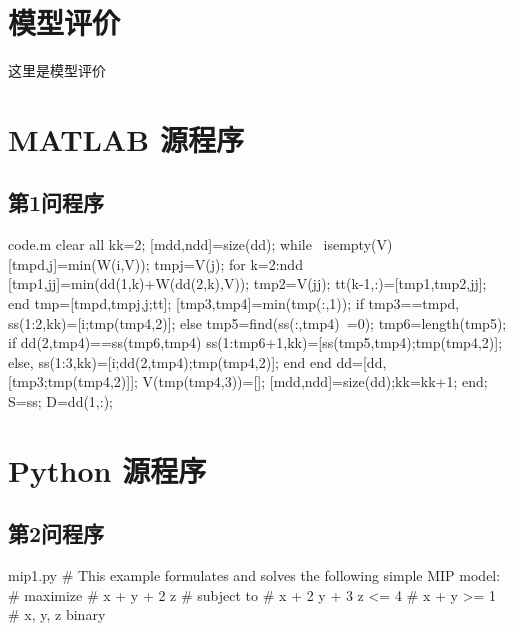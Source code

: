 \documentclass[bwprint,fontset=fandol]{gmcmthesis}
\begin{document}
\section{模型评价}

这里是模型评价



\cite{mittelbach_latex_2004,wright_latex3_2009,beeton_unicode_2008,vieth_experiences_2009}





\clearpage
\begin{appendices}
\section{MATLAB 源程序}
\renewcommand{\thesubsection}{A\thinskip.\thinskip\arabic{subsection}}
\subsection{第1问程序}
\vspace{-2ex}

\begin{Matlab}{code.m}
clear all
kk=2;
[mdd,ndd]=size(dd);
while ~isempty(V)
    [tmpd,j]=min(W(i,V));
    tmpj=V(j);
    for k=2:ndd
        [tmp1,jj]=min(dd(1,k)+W(dd(2,k),V));
        tmp2=V(jj);
        tt(k-1,:)=[tmp1,tmp2,jj];
    end
    tmp=[tmpd,tmpj,j;tt];
    [tmp3,tmp4]=min(tmp(:,1));
    if tmp3==tmpd,
        ss(1:2,kk)=[i;tmp(tmp4,2)];
    else
        tmp5=find(ss(:,tmp4)~=0);
        tmp6=length(tmp5);
        if dd(2,tmp4)==ss(tmp6,tmp4)
            ss(1:tmp6+1,kk)=[ss(tmp5,tmp4);tmp(tmp4,2)];
        else, ss(1:3,kk)=[i;dd(2,tmp4);tmp(tmp4,2)];
        end
    end
    dd=[dd,[tmp3;tmp(tmp4,2)]];
    V(tmp(tmp4,3))=[];
    [mdd,ndd]=size(dd);kk=kk+1;
end;
S=ss; D=dd(1,:);
\end{Matlab}
\vspace{2ex}

\clearpage
\section{Python 源程序}
\renewcommand{\thesubsection}{B\thinskip.\thinskip\arabic{subsection}}
\subsection{第2问程序}
\vspace{-2ex}
\begin{Python}{mip1.py}
# This example formulates and solves the following simple MIP model:
#  maximize
#        x +   y + 2 z
#  subject to
#        x + 2 y + 3 z <= 4
#        x +   y       >= 1
#        x, y, z binary


\end{Python}
\end{appendices}
\end{document}

